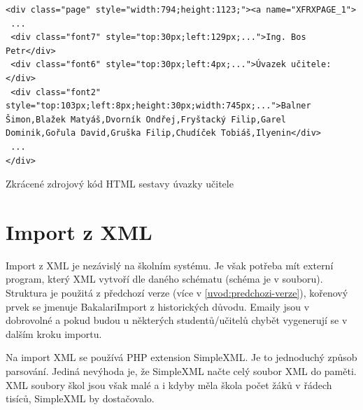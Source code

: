 \begin{code}[H]
  \begin{verbatim}
<div class="page" style="width:794;height:1123;"><a name="XFRXPAGE_1">
 ...
 <div class="font7" style="top:30px;left:129px;...">Ing. Bos Petr</div>
 <div class="font6" style="top:30px;left:4px;...">Úvazek učitele:</div>
 <div class="font2" style="top:103px;left:8px;height:30px;width:745px;...">Balner Šimon,Blažek Matyáš,Dvorník Ondřej,Fryštacký Filip,Garel Dominik,Gořula David,Gruška Filip,Chudíček Tobiáš,Ilyenin</div>
 ...
</div>
\end{verbatim}
\caption{Zkrácené zdrojový kód HTML sestavy úvazky učitele}
\end{code}


\section{Import z XML}
Import z XML je nezávislý na školním systému. Je však potřeba mít externí program, který XML vytvoří dle daného schématu (schéma je v souboru). Struktura je použitá z předchozí verze (více v \ref{uvod:predchozi-verze}), kořenový prvek se jmenuje BakalariImport z historických důvodu. Emaily jsou v dobrovolné a pokud budou u některých studentů/učitelů chybět vygenerují se v dalším kroku importu.

Na import XML se používá PHP extension SimpleXML. Je to jednoduchý způsob parsování. Jediná nevýhoda je, že SimpleXML načte celý soubor XML do paměti. XML soubory škol jsou však malé a i kdyby měla škola počet žáků v řádech tisíců, SimpleXML by dostačovalo. 




